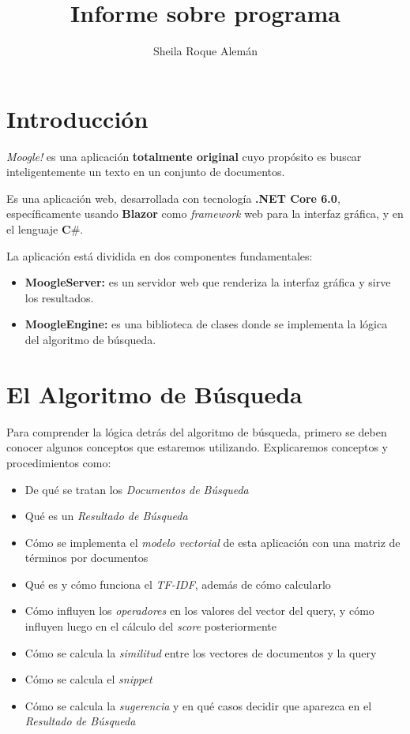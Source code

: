 \documentclass[12pt]{article}
\title{Informe sobre programa \Moogle}
\author{Sheila Roque Alemán}
\newcommand{\Moogle}{\emph{Moogle!} }
\newcommand{\SearchItems}{\emph{Documentos de Búsqueda} }
\newcommand{\SearchResult}{\emph{Resultado de Búsqueda} }
\begin{document}
\maketitle

\section*{Introducción}

	\Moogle es una aplicación \textbf{totalmente original} cuyo propósito es buscar inteligentemente un texto en un conjunto de documentos.

	Es una aplicación web, desarrollada con tecnología \textbf{.NET Core 6.0}, específicamente usando \textbf{Blazor} como \textit{framework} web para la interfaz gráfica, y en el lenguaje $\textbf{C\#}$.
	
	La aplicación está dividida en dos componentes fundamentales:

\begin{itemize}
	\item \textbf{MoogleServer:} es un servidor web que renderiza la interfaz gráfica y sirve los resultados.
	\item \textbf{MoogleEngine:} es una biblioteca de clases donde se implementa la lógica del algoritmo de búsqueda.
\end{itemize}

\section*{El Algoritmo de Búsqueda}
	Para comprender la lógica detrás del algoritmo de búsqueda, primero se deben conocer algunos conceptos que estaremos utilizando. Explicaremos conceptos y procedimientos como:

\begin{itemize}
	\item De qué se tratan los \SearchItems
	\item Qué es un \SearchResult
	\item Cómo se implementa el \emph{modelo vectorial} de esta aplicación con una matriz de términos por documentos
	\item Qué es y cómo funciona el \emph{TF-IDF}, además de cómo calcularlo
	\item Cómo influyen los \emph{operadores} en los valores del vector del query, y cómo influyen luego en el cálculo del \emph{score} posteriormente
	\item Cómo se calcula la \emph{similitud} entre los vectores de documentos y la query
	\item Cómo se calcula el \emph{snippet}
	\item Cómo se calcula la \emph{sugerencia} y en qué casos decidir que aparezca en el \SearchResult
\end{itemize}
\end{document}

